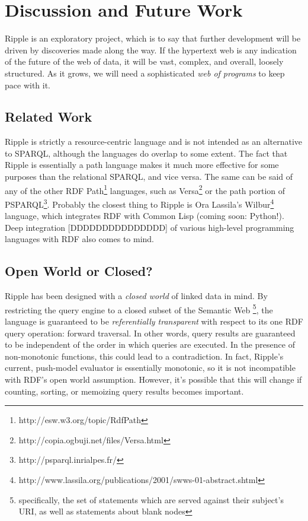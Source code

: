 \documentclass[runningheads]{llncs}
\begin{document}
\section{Discussion and Future Work}
Ripple is an exploratory project, which is to say that further development will be driven by discoveries made along the way.  If the hypertext web is any indication of the future of the web of data, it will be vast, complex, and overall, loosely structured.  As it grows, we will need a sophisticated \textit{web of programs} to keep pace with it.


\subsection{Related Work}
Ripple is strictly a resource-centric language and is not intended as an alternative to SPARQL, although the languages do overlap to some extent.  The fact that Ripple is essentially a path language makes it much more effective for some purposes than the relational SPARQL, and vice versa.  The same can be said of any of the other RDF Path\footnote{http://esw.w3.org/topic/RdfPath} languages, such as Versa\footnote{http://copia.ogbuji.net/files/Versa.html} or the path portion of PSPARQL\footnote{http://psparql.inrialpes.fr/}.  Probably the closest thing to Ripple is Ora Lassila's Wilbur\footnote{http://www.lassila.org/publications/2001/swws-01-abstract.shtml} language, which integrates RDF with Common Lisp (coming soon: Python!).  Deep integration [DDDDDDDDDDDDDDD] of various high-level programming languages with RDF also comes to mind.


\subsection{Open World or Closed?}
Ripple has been designed with a \textit{closed world} of linked data in mind.  By restricting the query engine to a closed subset of the Semantic Web \footnote{specifically, the set of statements which are served against their subject's URI, as well as statements about blank nodes}, the language is guaranteed to be \textit{referentially transparent} with respect to its one RDF query operation: forward traversal.  In other words, query results are guaranteed to be independent of the order in which queries are executed.  In the presence of non-monotonic functions, this could lead to a contradiction.  In fact, Ripple's current, push-model evaluator is essentially monotonic, so it is not incompatible with RDF's open world assumption.  However, it's possible that this will change if counting, sorting, or memoizing query results becomes important.
\end{document}
